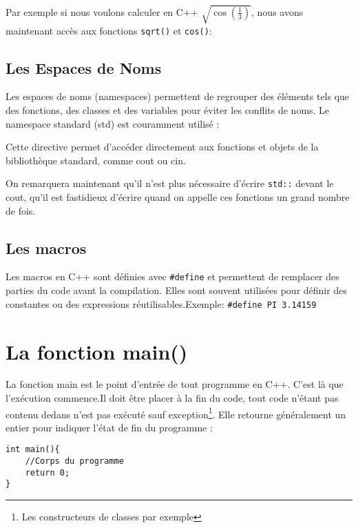 Par exemple si nous voulons calculer en C++ $\sqrt{\cos(\frac{1}{3})}$, nous avons maintenant accès aux fonctions \lstinline|sqrt()| et \lstinline|cos()|:



\subsection{Les Espaces de Noms}

Les espaces de noms (namespaces) permettent de regrouper des éléments tels que des fonctions, des classes et des variables pour éviter les conflits de noms. Le namespace standard (std) est couramment utilisé :



Cette directive permet d'accéder directement aux fonctions et objets de la bibliothèque standard, comme cout ou cin.



On remarquera maintenant qu'il n'est plus nécessaire d'écrire \lstinline|std::| devant le cout, qu'il est fastidieux d'écrire quand on appelle ces fonctions un grand nombre de fois.

\subsection{Les macros}

Les macros en C++ sont définies avec \lstinline|#define| et permettent de remplacer des parties du code avant la compilation. Elles sont souvent utilisées pour définir des constantes ou des expressions réutilisables.Exemple:
\lstinline|#define PI 3.14159|

\section{La fonction main()} 

La fonction main est le point d’entrée de tout programme en C++. C’est là que l’exécution commence.Il doit être placer à la fin du code, tout code n'étant pas contenu dedans n'est pas exécuté sauf exception\footnote{Les constructeurs de classes par exemple}. Elle retourne généralement un entier pour indiquer l’état de fin du programme :

\begin{lstlisting}
int main(){
	//Corps du programme
	return 0;
}
\end{lstlisting}

